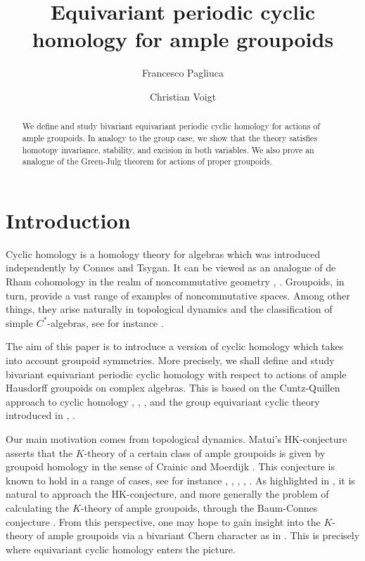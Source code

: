 \documentclass{amsart}
\title{Equivariant periodic cyclic homology for ample groupoids}
\author{Francesco Pagliuca}
\author{Christian Voigt}
\begin{document}
\begin{abstract}
We define and study bivariant equivariant periodic cyclic homology for actions of ample groupoids. In analogy to the group case, we show that the theory satisfies homotopy invariance, stability, and excision in both variables. We also prove an analogue of the Green-Julg theorem for actions of proper groupoids. 
\end{abstract}

\maketitle

\section{Introduction}

Cyclic homology is a homology theory for algebras which was introduced inde\-pendently by Connes and Tsygan. It can be viewed as an analogue of de Rham cohomology in the realm of noncommutative geometry \cite{CONNES_noncommutativedifferentialgeometry}, \cite{CONNES_noncommutativegeometry}. 
Groupoids, in turn, provide a vast range of examples of noncommutative spaces. Among other things, they arise naturally in topological dynamics and the classification of simple $ C^* $-algebras, see for instance \cite{LI_classifiablecartan}. 

The aim of this paper is to introduce a version of cyclic homology which takes into account groupoid symmetries. More precisely, we shall define and study bivariant equivariant periodic cyclic homology with respect to actions of ample Hausdorff groupoids on complex algebras. This is based on the Cuntz-Quillen approach to cyclic homology  \cite{CUNTZ_QUILLEN_algebraextensions}, \cite{CUNTZ_QUILLEN_nonsingularity}, \cite{CUNTZ_QUILLEN_excision}, and the group equivariant cyclic theory introduced in \cite{VOIGT_thesis}, \cite{VOIGT_equivariantperiodiccyclichomology}. 

Our main motivation comes from topological dynamics. Matui's HK-conjecture \cite{MATUI_etalegroupoidshifts} 
asserts that the $ K $-theory of a certain class of ample groupoids is given by groupoid homology in the sense of Crainic and Moerdijk \cite{CRAINIC_MOERDIJK_homologyetalegroupoids}. This conjecture is known to hold in a range of cases, see for instance
\cite{MATUI_homologyandtoplogicalfullgroups}, \cite{MATUI_etalegroupoidshifts},  
\cite{FARSI_KUMJIAN_PASK_SIMS_amplegroupoidshomology}, \cite{PROIETTI_YAMASHITA_homologyktheory1}, \cite{BOENICKE_DELLAIERA_GABE_WILLETT_dynamicasymptoticdimension}. 
As highlighted in \cite{PROIETTI_YAMASHITA_homologyktheory1}, it is natural to approach the HK-conjecture, and more generally the problem of calculating the $ K $-theory of ample groupoids, through the Baum-Connes conjecture \cite{TU_feuilletagesmoyennables}. From this perspective, one may hope to gain insight into the $ K $-theory of ample groupoids via a bivariant Chern character as in \cite{VOIGT_chern}. This is precisely where equivariant cyclic homology enters the picture. 
\end{document}
